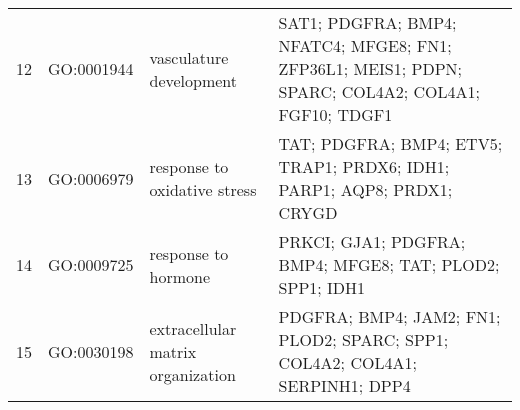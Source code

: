 \begin{table}[htp]
\begin{center}
\begin{tabular}{|c|c|p{1.5in}|p{4in}|}
12 & GO:0001944 & vasculature development & \footnotesize{SAT1; PDGFRA; BMP4; NFATC4; MFGE8; FN1; ZFP36L1; MEIS1; PDPN; SPARC; COL4A2; COL4A1; FGF10; TDGF1} \\ 
13 & GO:0006979 & response to oxidative stress & \footnotesize{TAT; PDGFRA; BMP4; ETV5; TRAP1; PRDX6; IDH1; PARP1; AQP8; PRDX1; CRYGD} \\ 
14 & GO:0009725 & response to hormone & \footnotesize{PRKCI; GJA1; PDGFRA; BMP4; MFGE8; TAT; PLOD2; SPP1; IDH1} \\ 
15 & GO:0030198 & extracellular matrix organization & \footnotesize{PDGFRA; BMP4; JAM2; FN1; PLOD2; SPARC; SPP1; COL4A2; COL4A1; SERPINH1; DPP4} \\ 

\end{tabular}
\end{center}
\end{table}
